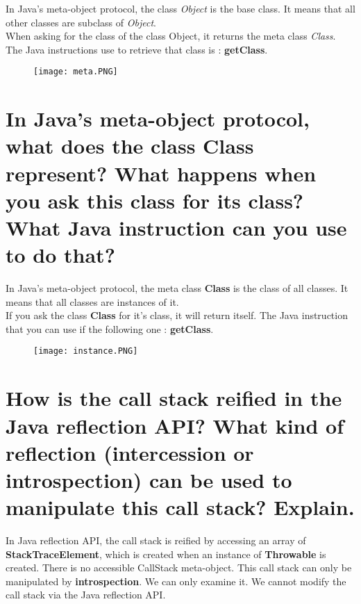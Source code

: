 In Java's meta-object protocol, the class \textit{Object} is the base class. It means that all other classes are subclass of \textit{Object}. \\

When asking for the class of the class Object, it returns the meta class \textit{Class}.  The Java instructions use to retrieve that class is :  \textbf{getClass}.

\begin{figure}[!ht]
	\centering
	\texttt{[image: meta.PNG]}
\end{figure}
\FloatBarrier{}

\section{In Java’s meta-object protocol, what does the class Class represent?
What happens when you ask this class for its class?
What Java instruction can you use to do that?}

In Java's meta-object protocol, the meta class \textbf{Class} is the class of all classes. It means that all classes are instances of it. \\
If you ask the class \textbf{Class} for it's class, it will return itself. The Java instruction that you can use if the following one :  \textbf{getClass}.

\begin{figure}[!ht]
	\centering
	\texttt{[image: instance.PNG]}
\end{figure}
\FloatBarrier{}

\section{How is the call stack reified in the Java reflection API?
What kind of reflection (intercession or introspection) can be used to manipulate this call
stack? Explain.}

In Java reflection API, the call stack is reified by accessing an array of \textbf{StackTraceElement}, which is created when an instance of \textbf{Throwable} is created. There is no accessible CallStack meta-object. This call stack can only be manipulated by \textbf{introspection}. We can only examine it. We cannot modify the call stack via the Java reflection API.
